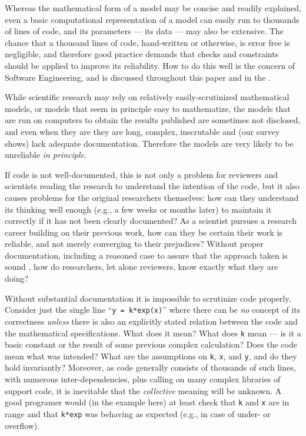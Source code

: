 \documentclass{comjnl}
\begin{document}
Whereas the mathematical form of a model may be concise and readily explained, even a basic computational representation of a model can easily run to thousands of lines of code, and its parameters --- its data --- may also be extensive. The chance that a thousand lines of code, hand-written or otherwise, is error free is negligible, and therefore good practice demands that checks and constraints should be applied to improve its reliability. How to do this well is the concern of Software Engineering, and is discussed throughout this paper and in the \supplement. 

While scientific research may rely on relatively easily-scrutinized mathematical models, or models that seem in principle easy to mathematize, the models that are run on computers to obtain the results published are sometimes not disclosed, and even when they are they are long, complex, inscrutable and (our survey shows) lack adequate documentation. Therefore the models are very likely to be unreliable \emph{in principle}. 

If code is not well-documented, this is not only a problem for reviewers and scientists reading the research to understand the intention of the code, but it also causes problems for the original researchers themselves: how can they understand its thinking well enough (e.g., a few weeks or months later) to maintain it correctly if it has not been clearly documented? As a scientist pursues a research career building on their previous work, how can they be certain their work is reliable, and not merely converging to their  prejudices? Without proper documentation, including a reasoned case to assure that the approach taken is sound \cite{assurance-case}, how do researchers, let alone reviewers, know exactly what they are doing?

Without substantial documentation it is impossible to scrutinize code properly. Consider just the single line ``\texttt{y = k*exp(x)}'' where there can be \emph{no\/} concept of its correctness \emph{unless\/} there is also an explicitly stated relation between the code and the mathematical specifications. What does it mean? What does \texttt{k} mean --- is it a basic constant or the result of some previous complex calculation? Does the code mean what was intended? What are the assumptions on \texttt{k}, \texttt{x}, and \texttt{y}, and do they hold invariantly? Moreover, as code generally consists of thousands of such lines, with numerous inter-dependencies, plus calling on many complex libraries of support code, it is inevitable that the \emph{collective\/} meaning will be unknown. A good programer would (in the example here) at least check that \texttt{k} and \texttt{x} are in range and that \texttt{k*exp} was behaving as expected (e.g., in case of under- or overflow).
\end{document}
